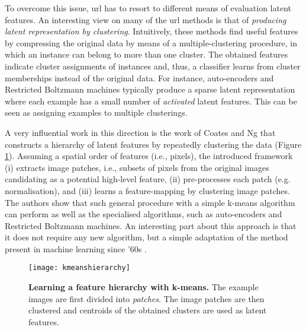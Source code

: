 To overcome this issue, \gls{url} has to resort to different means of evaluation latent features.
An interesting view on many of the \gls{url} methods is that of \textit{producing latent representation by clustering}.
Intuitively, these methods find useful features by compressing the original data by means of a  multiple-clustering procedure, in which an instance can belong to more than one cluster.
The obtained features indicate cluster assignments of instances and, thus, a classifier learns from cluster memberships instead of the original data.
For instance, auto-encoders and Restricted Boltzmann machines typically produce a sparse latent representation where each example has a small number of \textit{activated} latent features.
This can be seen as assigning examples to multiple clusterings.


A very influential work in this direction is the work of Coates and Ng \cite{coates2011analysis} that constructs a hierarchy of latent features by repeatedly clustering the data  (Figure \ref{fig:kmeansh}).
Assuming a spatial order of features (i.e., pixels), the introduced framework (i) extracts image patches, i.e., subsets of pixels from the original images candidating as a potential high-level feature, (ii) pre-processes each patch (e.g. normalisation), and (iii) learns a feature-mapping by clustering image patches.
The authors show that such general procedure with a simple k-means algorithm can perform as well as the specialised algorithms, such as auto-encoders and  Restricted Boltzmann machines.
An interesting part about this approach is that it does not require any new algorithm, but a simple adaptation of the method present in machine learning since '60s \cite{kmeans}.





\begin{figure}
	\medskip
	\centering
	\texttt{[image: kmeanshierarchy]}
	\caption[Learning a feature hierarchy with k-means]{\textbf{Learning a feature hierarchy with k-means.} The example images are first divided into \textit{patches}. The image patches are then clustered and centroids of the obtained clusters are used as latent features.}
	\label{fig:kmeansh}
\end{figure}



